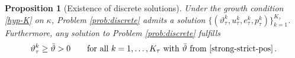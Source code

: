 \documentclass[a4paper,10pt,reqno]{amsart}
\numberwithin{equation}{section}
\numberwithin{equation}{section}
\newtheorem{proposition}[theorem]{Proposition}
\newcommand{\teta}{\vartheta}
\newcommand{\bbD}{\mathbb{D}}
\newcommand{\bbB}{\mathbb{B}}
\newcommand{\condu}{\kappa}
\newcommand{\utau}[1]{u_\tau^{#1}}
\newcommand{\ptau}[1]{p_\tau^{#1}}
\newcommand{\etau}[1]{e_\tau^{#1}}
\newcommand{\tetau}[1]{\teta_\tau^{#1}}
\begin{document}
\begin{proposition}[Existence of discrete solutions]
\label{prop:exist-discr}
Under  the growth condition \eqref{hyp-K} on $\condu$, Problem \ref{prob:discrete} admits a solution 
 $\{(\tetau{k}, \utau{k}, \etau{k}, \ptau{k})\}_{k=1}^{K_\tau}$. Furthermore, any solution  to  Problem \ref{prob:discrete} fulfills
\begin{equation}
\label{discr-strict-pos}
\tetau{k}\geq \bar{\teta}>0 \qquad \text{for all } k =1, \ldots, K_\tau  \text{ with  $\bar{\teta}$ from \eqref{strong-strict-pos}}\,.  
\end{equation}
\end{proposition} 
\end{document}
